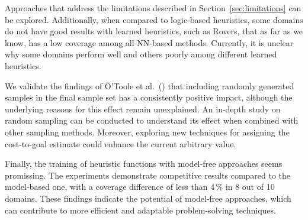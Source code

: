 Approaches that address the limitations described in Section~\ref{sec:limitations} can be explored. Additionally, when compared to logic-based heuristics, some domains do not have good results with learned heuristics, such as Rovers, that as far as we know, has a low coverage among all NN-based methods. Currently, it is unclear why some domains perform well and others poorly among different learned heuristics.

We validate the findings of O'Toole et al.~(\citeyear{OToole/2022}) that including randomly generated samples in the final sample set has a consistently positive impact, although the underlying reasons for this effect remain unexplained. An in-depth study on random sampling can be conducted to understand its effect when combined with other sampling methods. Moreover, exploring new techniques for assigning the cost-to-goal estimate could enhance the current arbitrary value.

Finally, the training of heuristic functions with model-free approaches seems promissing. The experiments demonstrate competitive results compared to the model-based one, with a coverage difference of less than $4\,\%$ in 8 out of 10 domains. These findings indicate the potential of model-free approaches, which can contribute to more efficient and adaptable problem-solving techniques.
